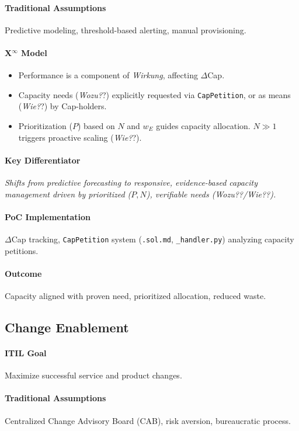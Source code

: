 \documentclass[12pt, a4paper]{scrartcl}
\newcommand{\Xinf}{X$^\infty$}                        %
\newcommand{\DeltaCap}{$\Delta$Cap}                    %
\newcommand{\Wirkung}{\textit{Wirkung}}                 %
\newcommand{\CapPetition}{\texttt{CapPetition}}        %
\newcommand{\Wozu}{\textit{Wozu?}}                      %
\newcommand{\Wie}{\textit{Wie?}}                        %
\begin{document}
\paragraph{Traditional Assumptions} Predictive modeling, threshold-based alerting, manual provisioning.
\paragraph*{\Xinf{} Model}
\begin{itemize}
    \item Performance is a component of \Wirkung{}, affecting \DeltaCap{}.
    \item Capacity needs (\Wozu?) explicitly requested via \CapPetition{}, or as means (\Wie?) by Cap-holders.
    \item Prioritization ($P$) based on $N$ and $w_E$ guides capacity allocation. $N \gg 1$ triggers proactive scaling (\Wie?).
\end{itemize}
\paragraph{Key Differentiator} \textit{Shifts from predictive forecasting to responsive, evidence-based capacity management driven by prioritized ($P,N$), verifiable needs (\Wozu?/\Wie?).}
\paragraph{PoC Implementation} \DeltaCap{} tracking, \CapPetition{} system (\texttt{.sol.md}, \texttt{\_handler.py}) analyzing capacity petitions.
\paragraph{Outcome} Capacity aligned with proven need, prioritized allocation, reduced waste.

\subsection{Change Enablement} %
\paragraph{ITIL Goal} Maximize successful service and product changes.
\paragraph{Traditional Assumptions} Centralized Change Advisory Board (CAB), risk aversion, bureaucratic process.
\end{document}
